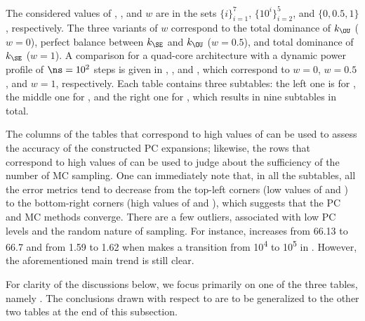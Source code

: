 The considered values of \lc, \no, and $w$ are in the sets $\{ i \}_{i = 1}^7$,
$\{ 10^i \}_{i = 2}^5$, and $\{ 0, 0.5, 1 \}$, respectively. The three variants
of $w$ correspond to the total dominance of $k_\OU$ ($w = 0$), perfect balance
between $k_\SE$ and $k_\OU$ ($w = 0.5$), and total dominance of $k_\SE$ ($w =
1$). A comparison for a quad-core architecture with a dynamic power profile of
$\ns = 10^2$ steps is given in ,
, and ,
which correspond to $w = 0$, $w = 0.5$, and $w = 1$, respectively. Each table
contains three subtables: the left one is for \error{\expectation}, the middle
one for \error{\variance}, and the right one for , which results in
nine subtables in total.

The columns of the tables that correspond to high values of \no can be used to
assess the accuracy of the constructed \ac{PC} expansions; likewise, the rows
that correspond to high values of \lc can be used to judge about the sufficiency
of the number of \ac{MC} sampling. One can immediately note that, in all the
subtables, all the error metrics tend to decrease from the top-left corners (low
values of \lc and \no) to the bottom-right corners (high values of \lc and \no),
which suggests that the \ac{PC} and \ac{MC} methods converge. There are a few
outliers, associated with low \ac{PC} levels and the random nature of sampling.
For instance, \error{\variance} increases from 66.13 to 66.7 and  from
1.59 to 1.62 when \no makes a transition from 10\textsuperscript{4} to
10\textsuperscript{5} in . However, the
aforementioned main trend is still clear.

For clarity of the discussions below, we focus primarily on one of the three
tables, namely . The conclusions drawn with
respect to  are to be generalized to the
other two tables at the end of this subsection.

